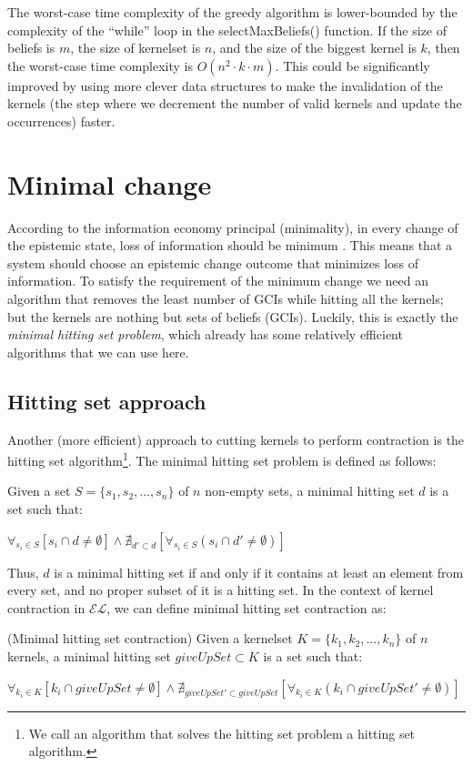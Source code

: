 The worst-case time complexity of the greedy algorithm is lower-bounded by the complexity of the ``while'' loop in the selectMaxBeliefs() function. If the size of beliefs is $m$, the size of kernelset is $n$, and the size of the biggest kernel is $k$, then the worst-case time complexity is $O(n^2 \cdot k \cdot m)$. This could be significantly improved by using more clever data structures to make the invalidation of the kernels (the step where we decrement the number of valid kernels and update the occurrences) faster.


\section{Minimal change}
According to the information economy principal (minimality), in every change of the epistemic state, loss of information should be minimum \cite{econ}. This means that a system should choose an epistemic change outcome that minimizes loss of information. To satisfy the requirement of the minimum change we need an algorithm that removes the least number of GCIs while hitting all the kernels; but the kernels are nothing but sets of beliefs (GCIs). Luckily, this is exactly the \textit{minimal hitting set problem}, which already has some relatively efficient algorithms that we can use here. 

\subsection{Hitting set approach}
Another (more efficient) approach to cutting kernels to perform contraction is the hitting set algorithm\footnote{We call an algorithm that solves the hitting set problem a hitting set algorithm.}. The minimal hitting set problem is defined as follows:
\begin{defn}\cite{hit}
Given a set $S=\{s_{1}, s_{2}, ..., s_{n}\}$ of $n$ non-empty sets, a minimal hitting set $d$ is a set such that:
\begin{center}
$\forall_{s_{i} \in S} [ s_{i} \cap d \neq \emptyset] \wedge \nexists_{d' \subset d}[\forall_{s_{i} \in S} (s_{i} \cap d' \neq \emptyset) ]$
\end{center}
\end{defn}

Thus, $d$ is a minimal hitting set if and only if it contains at least an element from every set, and no proper subset of it is a hitting set. In the context of kernel contraction in $\mathcal{EL}$, we can define minimal hitting set contraction as:
\begin{defn}(Minimal hitting set contraction)
Given a kernelset $K=\{k_{1}, k_{2}, ..., k_{n}\}$ of $n$ kernels, a minimal hitting set $giveUpSet \subset K$ is a set such that:
\begin{center}
$\forall_{k_{i} \in K} [ k_{i} \cap giveUpSet \neq \emptyset] \wedge \nexists_{giveUpSet' \subset giveUpSet}[\forall_{k_{i} \in K} (k_{i} \cap giveUpSet' \neq \emptyset) ]$
\end{center}
\end{defn}

